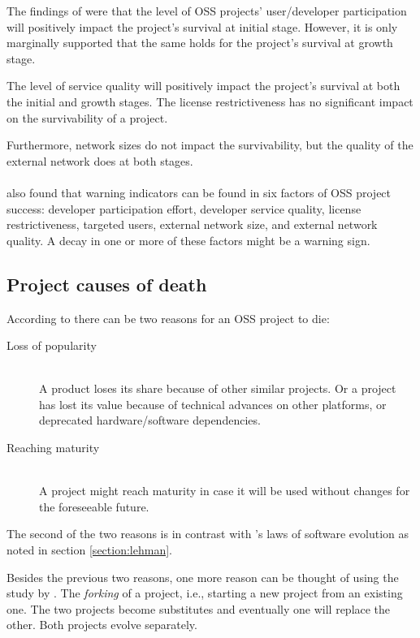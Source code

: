 \noindent
The findings of \citet{wang2012} were that the level of OSS projects'
user/developer participation will positively impact the project's survival at
initial stage. However, it is only marginally supported that the same holds for
the project's survival at growth stage.

The level of service quality will positively impact the project's survival at
both the initial and growth stages. The license restrictiveness has no
significant impact on the survivability of a project.

Furthermore, network sizes do not impact the survivability, but the quality of
the external network does at both stages.

\paragraph{}
\citet{wang2012} also found that warning indicators can be found in six factors
of OSS project success: developer participation effort, developer service
quality, license restrictiveness, targeted users, external network size, and
external network quality. A decay in one or more of these factors might be a
warning sign.

\subsection{Project causes of death}
According to \citet{karus20132} there can be two reasons for an OSS project to
die:

\begin{description}
	\item[Loss of popularity] \hfill \\ A product loses its share because of
		other similar projects. Or a project has lost its value because of technical
		advances on other platforms, or deprecated hardware/software dependencies.
		
	\item[Reaching maturity] \hfill \\ A project might reach maturity in case it
		will be used without changes for the foreseeable future.
\end{description}

\noindent
The second of the two reasons is in contrast with \citet{lehman}'s laws of
software evolution as noted in section \ref{section:lehman}.

Besides the previous two reasons, one more reason can be thought of using the
study by \citet{nakakoji}. The \textit{forking} of a project, i.e., starting
a new project from an existing one. The two projects become substitutes and
eventually one will replace the other. Both projects evolve separately.

